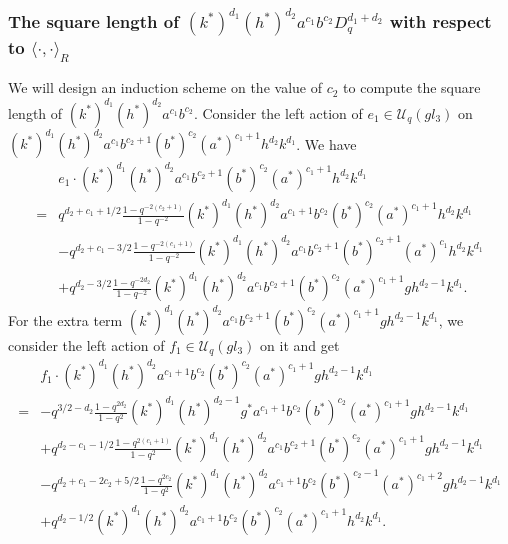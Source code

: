 \documentclass[table,a4paper,reqno]{amsart}
\numberwithin{equation}{section}
\theoremstyle{definition}
\begin{document}
\subsubsection{The square length of $(k^*)^{d_1}(h^*)^{d_2}a^{c_1}b^{c_2}D_q^{d_1+d_2}$ with respect to $\langle \cdot,\cdot\rangle_R$}
We will design an induction scheme on the value of $c_2$ to compute the square length of $(k^*)^{d_1}(h^*)^{d_2}a^{c_1}b^{c_2}$. Consider the left action of $e_1\in \mathcal{U}_q(gl_3)$ on\\ $(k^*)^{d_1}(h^*)^{d_2}a^{c_1}b^{c_2+1}(b^*)^{c_2}(a^*)^{c_1+1}h^{d_2}k^{d_1}$. We have
\begin{equation}\label{eq:5.32}
    \begin{split}
        &e_1\cdot (k^*)^{d_1}(h^*)^{d_2}a^{c_1}b^{c_2+1}(b^*)^{c_2}(a^*)^{c_1+1}h^{d_2}k^{d_1}\\
        =&q^{d_2+c_1+1/2}\frac{1-q^{-2(c_2+1)}}{1-q^{-2}}(k^*)^{d_1}(h^*)^{d_2}a^{c_1+1}b^{c_2}(b^*)^{c_2}(a^*)^{c_1+1}h^{d_2}k^{d_1}\\
        &-q^{d_2+c_1-3/2}\frac{1-q^{-2(c_1+1)}}{1-q^{-2}}(k^*)^{d_1}(h^*)^{d_2}a^{c_1}b^{c_2+1}(b^*)^{c_2+1}(a^*)^{c_1}h^{d_2}k^{d_1}\\
        &+q^{d_2-3/2}\frac{1-q^{-2d_2}}{1-q^{-2}}(k^*)^{d_1}(h^*)^{d_2}a^{c_1}b^{c_2+1}(b^*)^{c_2}(a^*)^{c_1+1}gh^{d_2-1}k^{d_1}.
    \end{split}
\end{equation}
For the extra term $(k^*)^{d_1}(h^*)^{d_2}a^{c_1}b^{c_2+1}(b^*)^{c_2}(a^*)^{c_1+1}gh^{d_2-1}k^{d_1}$, we consider the left action of $f_1\in \mathcal{U}_q(gl_3)$ on it and get
\begin{equation}\label{eq:5.33}
    \begin{split}
        &f_1\cdot (k^*)^{d_1}(h^*)^{d_2}a^{c_1+1}b^{c_2}(b^*)^{c_2}(a^*)^{c_1+1}gh^{d_2-1}k^{d_1}\\
        =&-q^{3/2-d_2}\frac{1-q^{2d_2}}{1-q^2}(k^*)^{d_1}(h^*)^{d_2-1}g^*a^{c_1+1}b^{c_2}(b^*)^{c_2}(a^*)^{c_1+1}gh^{d_2-1}k^{d_1}\\
        &+q^{d_2-c_1-1/2}\frac{1-q^{2(c_1+1)}}{1-q^2}(k^*)^{d_1}(h^*)^{d_2}a^{c_1}b^{c_2+1}(b^*)^{c_2}(a^*)^{c_1+1}gh^{d_2-1}k^{d_1}\\
        &-q^{d_2+c_1-2c_2+5/2}\frac{1-q^{2c_2}}{1-q^2}(k^*)^{d_1}(h^*)^{d_2}a^{c_1+1}b^{c_2}(b^*)^{c_2-1}(a^*)^{c_1+2}gh^{d_2-1}k^{d_1}\\
        &+q^{d_2-1/2}(k^*)^{d_1}(h^*)^{d_2}a^{c_1+1}b^{c_2}(b^*)^{c_2}(a^*)^{c_1+1}h^{d_2}k^{d_1}.
    \end{split}
\end{equation}
\end{document}
